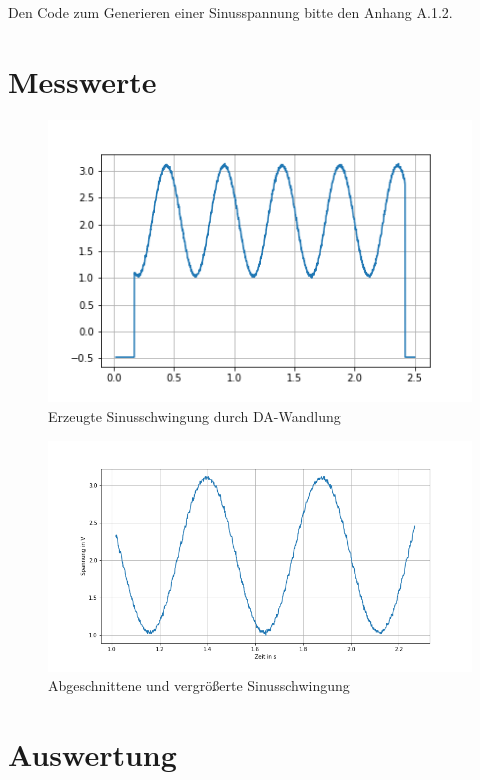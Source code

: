 \documentclass[12pt, oneside, a4paper, \docLanguage]{report}
\begin{document}
Den Code zum Generieren einer Sinusspannung bitte den Anhang A.1.2.

\section{Messwerte}
\label{chap:VERSUCH_4_MESSWERTE}

\begin{figure}[H]
	\centering\small
	\includegraphics[width=12cm]{v4ori.png}
	\caption{Erzeugte Sinusschwingung durch DA-Wandlung}
\end{figure}

\begin{figure}[H]
	\centering\small
	\includegraphics[width=15cm]{v4neu.png}
	\caption{Abgeschnittene und vergrößerte Sinusschwingung}
\end{figure}


\section{Auswertung}

\label{chap:VERSUCH_4_AUSWERTUNG}
\end{document}
